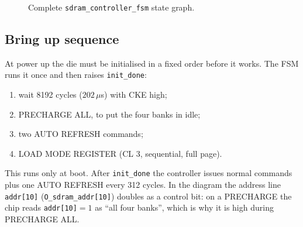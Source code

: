 \documentclass[a4paper,10pt]{article}
\begin{document}
\begin{figure}[H]
{%
}
\caption{Complete \texttt{sdram\_controller\_fsm} state graph.}
\label{fig:sdram-fsm}
\end{figure}

\subsection{Bring up sequence}

At power up the die must be initialised in a fixed order before it works. The FSM runs it once and then raises \texttt{init\_done}:
\begin{enumerate}\setlength{\itemsep}{0pt}
\item wait 8192 cycles ($202\,\mu$s) with CKE high;
\item PRECHARGE ALL, to put the four banks in idle;
\item two AUTO REFRESH commands;
\item LOAD MODE REGISTER (CL 3, sequential, full page).
\end{enumerate}
This runs only at boot. After \texttt{init\_done} the controller issues normal commands
plus one AUTO REFRESH every 312 cycles. In the diagram the address line
\texttt{addr[10]} (\texttt{O\_sdram\_addr[10]}) doubles as a control bit: on a PRECHARGE
the chip reads \texttt{addr[10]}$=1$ as ``all four banks'', which is why it is high
during PRECHARGE ALL.
\end{document}
